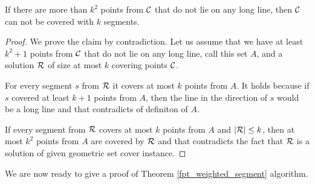 \begin{claim}
\label{few_points}
If there are more than $k^2$ points from $\mathcal{C}$
that do not lie on any long line,
then $\mathcal{C}$ can not be covered with $k$ segments.
\end{claim}

\begin{proof}
We prove the claim by contradiction.
Let us assume that we have at least $k^2+1$ points
from $\mathcal{C}$ that do not lie on any long line, call this set $A$,
and a solution $\mathcal{R}$ of size at most $k$ covering points $\mathcal{C}$.

For every segment $s$ from $\mathcal{R}$ it covers at most $k$
points from $A$.
It holds because if $s$ covered at least $k+1$ points from $A$,
then the line in the direction of $s$ would be a long line
and that contradicts of definiton of $A$.

If every segment from $\mathcal{R}$ covers at most $k$ points from $A$
and $|\mathcal{R}| \le k$, then at most $k^2$ points from $A$ are covered by $\mathcal{R}$
and that contradicts the fact that $\mathcal{R}$ is a solution of given
geometric set cover instance.
\end{proof}

We are now ready to give a proof of Theorem \ref{fpt_weighted_segment}
algorithm.

